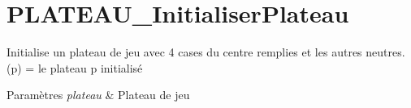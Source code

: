 \hypertarget{PLATEAU_InitialiserPlateau-example}{}\section{P\+L\+A\+T\+E\+A\+U\+\_\+\+Initialiser\+Plateau}
Initialise un plateau de jeu avec 4 cases du centre remplies et les autres neutres.(p) = le plateau p initialisé


\begin{DoxyParams}{Paramètres}
{\em plateau} & Plateau de jeu\\
\hline
\end{DoxyParams}

\begin{DoxyCodeInclude}
\end{DoxyCodeInclude}
 